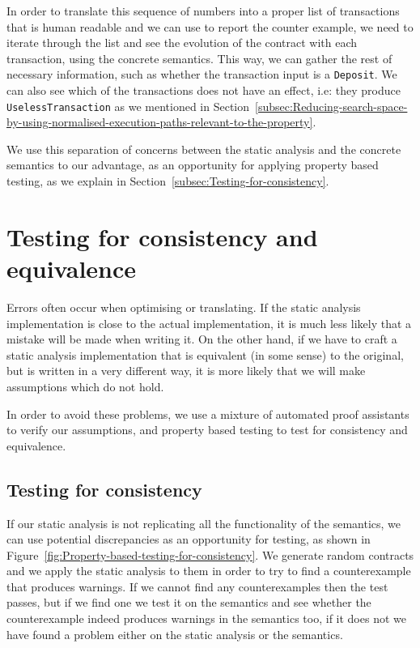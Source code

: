 \documentclass[english,runningheads]{llncs}
\begin{document}
In order to translate this sequence of numbers into a proper list
of transactions that is human readable and we can use to report the
counter example, we need to iterate through the list and see the evolution
of the contract with each transaction, using the concrete semantics.
This way, we can gather the rest of necessary information, such as
whether the transaction input is a \texttt{Deposit}. We can also see
which of the transactions does not have an effect, i.e: they produce
\texttt{UselessTransaction} as we mentioned in Section~\ref{subsec:Reducing-search-space-by-using-normalised-execution-paths-relevant-to-the-property}.

We use this separation of concerns between the static analysis and
the concrete semantics to our advantage, as an opportunity for applying
property based testing, as we explain in Section~\ref{subsec:Testing-for-consistency}.

\section{Testing for consistency and equivalence\label{sec:Testing}}

Errors often occur when optimising or translating. If the static analysis
implementation is close to the actual implementation, it is much less
likely that a mistake will be made when writing it. On the other hand,
if we have to craft a static analysis implementation that is equivalent
(in some sense) to the original, but is written in a very different
way, it is more likely that we will make assumptions which do not
hold.

In order to avoid these problems, we use a mixture of automated proof
assistants to verify our assumptions, and property based testing to
test for consistency and equivalence. 

\subsection{Testing for consistency\label{subsec:Testing-for-consistency} }

If our static analysis is not replicating all the functionality of
the semantics, we can use potential discrepancies as an opportunity
for testing, as shown in Figure~\ref{fig:Property-based-testing-for-consistency}.
We generate random contracts and we apply the static analysis to them
in order to try to find a counterexample that produces warnings. If
we cannot find any counterexamples then the test passes, but if we
find one we test it on the semantics and see whether the counterexample
indeed produces warnings in the semantics too, if it does not we have
found a problem either on the static analysis or the semantics.
\end{document}
